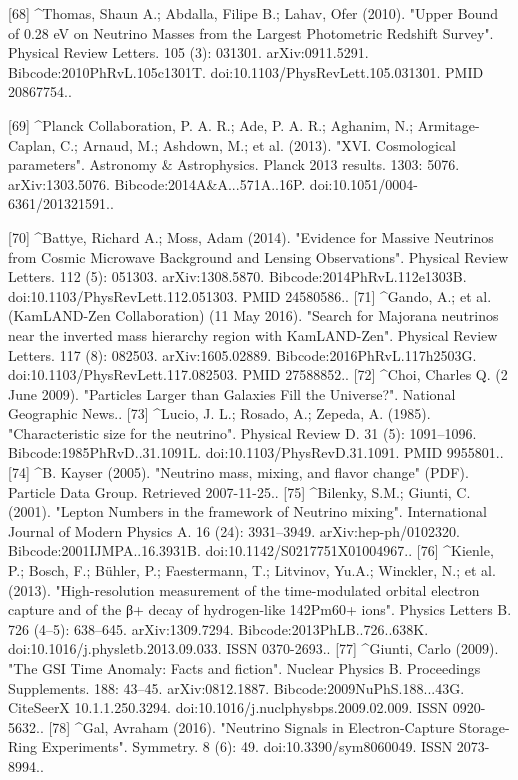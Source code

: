 [68]
^Thomas, Shaun A.; Abdalla, Filipe B.; Lahav, Ofer (2010). "Upper Bound of 0.28 eV on Neutrino Masses from the Largest Photometric Redshift Survey". Physical Review Letters. 105 (3): 031301. arXiv:0911.5291. Bibcode:2010PhRvL.105c1301T. doi:10.1103/PhysRevLett.105.031301. PMID 20867754..

[69]
^Planck Collaboration, P. A. R.; Ade, P. A. R.; Aghanim, N.; Armitage-Caplan, C.; Arnaud, M.; Ashdown, M.; et al. (2013). "XVI. Cosmological parameters". Astronomy & Astrophysics. Planck 2013 results. 1303: 5076. arXiv:1303.5076. Bibcode:2014A&A...571A..16P. doi:10.1051/0004-6361/201321591..

[70]
^Battye, Richard A.; Moss, Adam (2014). "Evidence for Massive Neutrinos from Cosmic Microwave Background and Lensing Observations". Physical Review Letters. 112 (5): 051303. arXiv:1308.5870. Bibcode:2014PhRvL.112e1303B. doi:10.1103/PhysRevLett.112.051303. PMID 24580586..
[71]
^Gando, A.; et al. (KamLAND-Zen Collaboration) (11 May 2016). "Search for Majorana neutrinos near the inverted mass hierarchy region with KamLAND-Zen". Physical Review Letters. 117 (8): 082503. arXiv:1605.02889. Bibcode:2016PhRvL.117h2503G. doi:10.1103/PhysRevLett.117.082503. PMID 27588852..
[72]
^Choi, Charles Q. (2 June 2009). "Particles Larger than Galaxies Fill the Universe?". National Geographic News..
[73]
^Lucio, J. L.; Rosado, A.; Zepeda, A. (1985). "Characteristic size for the neutrino". Physical Review D. 31 (5): 1091–1096. Bibcode:1985PhRvD..31.1091L. doi:10.1103/PhysRevD.31.1091. PMID 9955801..
[74]
^B. Kayser (2005). "Neutrino mass, mixing, and flavor change" (PDF). Particle Data Group. Retrieved 2007-11-25..
[75]
^Bilenky, S.M.; Giunti, C. (2001). "Lepton Numbers in the framework of Neutrino mixing". International Journal of Modern Physics A. 16 (24): 3931–3949. arXiv:hep-ph/0102320. Bibcode:2001IJMPA..16.3931B. doi:10.1142/S0217751X01004967..
[76]
^Kienle, P.; Bosch, F.; Bühler, P.; Faestermann, T.; Litvinov, Yu.A.; Winckler, N.; et al. (2013). "High-resolution measurement of the time-modulated orbital electron capture and of the β+ decay of hydrogen-like 142Pm60+ ions". Physics Letters B. 726 (4–5): 638–645. arXiv:1309.7294. Bibcode:2013PhLB..726..638K. doi:10.1016/j.physletb.2013.09.033. ISSN 0370-2693..
[77]
^Giunti, Carlo (2009). "The GSI Time Anomaly: Facts and fiction". Nuclear Physics B. Proceedings Supplements. 188: 43–45. arXiv:0812.1887. Bibcode:2009NuPhS.188...43G. CiteSeerX 10.1.1.250.3294. doi:10.1016/j.nuclphysbps.2009.02.009. ISSN 0920-5632..
[78]
^Gal, Avraham (2016). "Neutrino Signals in Electron-Capture Storage-Ring Experiments". Symmetry. 8 (6): 49. doi:10.3390/sym8060049. ISSN 2073-8994..
